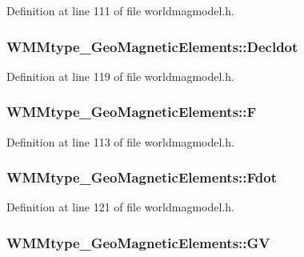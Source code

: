 Definition at line 111 of file worldmagmodel.\-h.

\hypertarget{struct_w_m_mtype___geo_magnetic_elements_ac37defec32ce23551b0d787961d5e615}{
\subsubsection[{Decldot}]{ W\-M\-Mtype\-\_\-\-Geo\-Magnetic\-Elements\-::\-Decldot}}\label{struct_w_m_mtype___geo_magnetic_elements_ac37defec32ce23551b0d787961d5e615}


Definition at line 119 of file worldmagmodel.\-h.

\hypertarget{struct_w_m_mtype___geo_magnetic_elements_a4c99b8d3e3432fca01948041425f1123}{
\subsubsection[{F}]{ W\-M\-Mtype\-\_\-\-Geo\-Magnetic\-Elements\-::\-F}}\label{struct_w_m_mtype___geo_magnetic_elements_a4c99b8d3e3432fca01948041425f1123}


Definition at line 113 of file worldmagmodel.\-h.

\hypertarget{struct_w_m_mtype___geo_magnetic_elements_a9a1465364de801ea9a6567f63aeddff7}{
\subsubsection[{Fdot}]{ W\-M\-Mtype\-\_\-\-Geo\-Magnetic\-Elements\-::\-Fdot}}\label{struct_w_m_mtype___geo_magnetic_elements_a9a1465364de801ea9a6567f63aeddff7}


Definition at line 121 of file worldmagmodel.\-h.

\hypertarget{struct_w_m_mtype___geo_magnetic_elements_a384032e354879712c50bee2ffef663c2}{
\subsubsection[{G\-V}]{ W\-M\-Mtype\-\_\-\-Geo\-Magnetic\-Elements\-::\-G\-V}}\label{struct_w_m_mtype___geo_magnetic_elements_a384032e354879712c50bee2ffef663c2}


